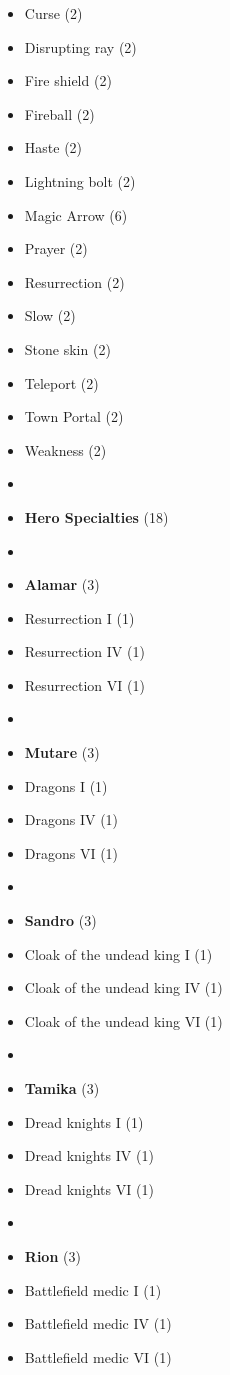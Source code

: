 \begin{multicols*}{3}
\begin{itemize}[leftmargin=0pt, label={}, noitemsep, noitemsep]
  \item Curse (2)
  \item Disrupting ray (2)
  \item Fire shield (2)
  \item Fireball (2)
  \item Haste (2)
  \item Lightning bolt (2)
  \item Magic Arrow (6)
  \item Prayer (2)
  \item Resurrection (2)
  \item Slow (2)
  \item Stone skin (2)
  \item Teleport (2)
  \item Town Portal (2)
  \item Weakness (2)
  \item
  \item \textbf{Hero Specialties} (18)
  \item
  \item \textbf{Alamar} (3)
  \item Resurrection I (1)
  \item Resurrection IV (1)
  \item Resurrection VI (1)
  \item
  \item \textbf{Mutare} (3)
  \item Dragons I (1)
  \item Dragons IV (1)
  \item Dragons VI (1)
  \item
  \item \textbf{Sandro} (3)
  \item Cloak of the undead king I (1)
  \item Cloak of the undead king IV (1)
  \item Cloak of the undead king VI (1)
  \item
  \item \textbf{Tamika} (3)
  \item Dread knights I (1)
  \item Dread knights IV (1)
  \item Dread knights VI (1)
  \item
  \item \textbf{Rion} (3)
  \item Battlefield medic I (1)
  \item Battlefield medic IV (1)
  \item Battlefield medic VI (1)

\end{itemize}
\end{multicols*}
